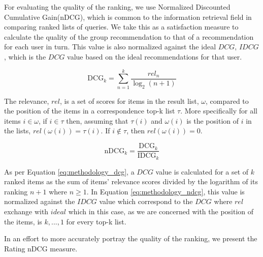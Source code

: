 \label{sec:methodology_ndcg}
For evaluating the quality of the ranking, we use Normalized Discounted Cumulative Gain(nDCG), which is common to the information retrieval field in comparing ranked lists of queries\cite{ndcg}. We take this as a satisfaction measure to calculate the quality of the group recommendation to that of a recommendation for each user in turn. This value is also normalized against the ideal $DCG$, $IDCG$, which is the $DCG$ value based on the ideal recommendations for that user.


\begin{equation}\label{eq:methodology_dcg}
\text{DCG}_k = \sum_{n=1}^{k}\frac{\textit{rel}_n}{\log_2(n + 1)}
\end{equation}

The relevance, $rel$, is a set of scores for items in the result list, $\omega$, compared to the position of the items in a correspondence top-k list $\tau$. More specifically for all items $i \in \omega$, if $i \in \tau$ then, assuming that $\tau(i)$ and $\omega(i)$ is the position of $i$ in the lists, $rel(\omega(i)) = \tau(i)$. If $i \notin \tau$, then $rel(\omega(i)) = 0$.


\begin{equation}\label{eq:methodology_ndcg}
\text{nDCG}_k = \frac{\text{DCG}_k}{\text{IDCG}_k}
\end{equation}

As per Equation \ref{eq:methodology_dcg}, a $DCG$ value is calculated for a set of $k$ ranked items as the sum of items' relevance scores divided by the logarithm of its ranking $n + 1$ where $n \geq 1$. In Equation \ref{eq:methodology_ndcg}, this value is normalized against the $IDCG$ value which correspond to the $DCG$ where $rel$ exchange with $ideal$ which in this case, as we are concerned with the position of the items, is $k,...,1$ for every top-k list. 

In an effort to more accurately portray the quality of the ranking, we present the Rating nDCG measure.

